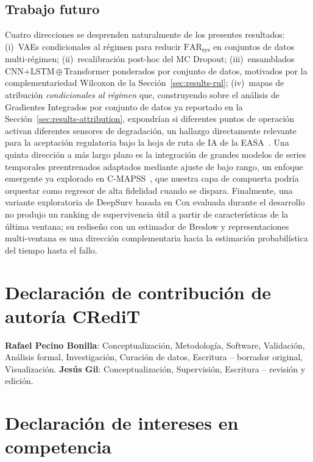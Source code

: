 \documentclass[5p,times,authoryear]{elsarticle}
\begin{document}
\subsection{Trabajo futuro}\label{sec:futurework}

\begin{sloppypar}
Cuatro direcciones se desprenden naturalmente de los presentes resultados: (i)~VAEs condicionales al régimen para reducir $\mathrm{FAR}_{\mathrm{sys}}$ en conjuntos de datos multi-régimen; (ii)~recalibración post-hoc del MC Dropout; (iii)~ensamblados CNN+LSTM\,$\oplus$\,Transformer ponderados por conjunto de datos, motivados por la complementariedad Wilcoxon de la Sección~\ref{sec:results-rul}; (iv)~mapas de atribución \emph{condicionales al régimen} que, construyendo sobre el análisis de Gradientes Integrados por conjunto de datos ya reportado en la Sección~\ref{sec:results-attribution}, expondrían si diferentes puntos de operación activan diferentes sensores de degradación, un hallazgo directamente relevante para la aceptación regulatoria bajo la hoja de ruta de IA de la EASA~\citep{easa2025roadmap}. Una quinta dirección a más largo plazo es la integración de grandes modelos de series temporales preentrenados adaptados mediante ajuste de bajo rango, un enfoque emergente ya explorado en C-MAPSS~\citep{chakravarty2025llm4ts}, que nuestra capa de compuerta podría orquestar como regresor de alta fidelidad cuando se dispara. Finalmente, una variante exploratoria de DeepSurv basada en Cox evaluada durante el desarrollo no produjo un ranking de supervivencia útil a partir de características de la última ventana; su rediseño con un estimador de Breslow y representaciones multi-ventana es una dirección complementaria hacia la estimación probabilística del tiempo hasta el fallo.
\end{sloppypar}

\clearpage
\section*{Declaración de contribución de autoría CRediT}

\textbf{Rafael Pecino Bonilla}: Conceptualización, Metodología, Software, Validación, Análisis formal, Investigación, Curación de datos, Escritura -- borrador original, Visualización. \textbf{Jesús Gil}: Conceptualización, Supervisión, Escritura -- revisión y edición.

\section*{Declaración de intereses en competencia}
\end{document}
